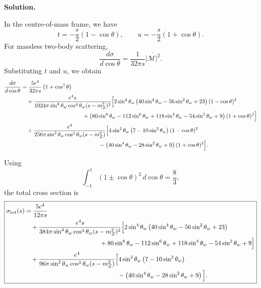 \documentclass[a4paper,11pt]{article}
\newenvironment{solution}{\par\medskip\noindent\textbf{Solution.}\par\smallskip}{\par\medskip}
\begin{document}
\begin{solution}
In the centre-of-mass frame, we have
\begin{equation}
    t=-\frac{s}{2}(1-\cos\theta),
    \qquad
    u=-\frac{s}{2}(1+\cos\theta).
\end{equation}
For massless two-body scattering,
\begin{equation}
    \frac{d\sigma}{d\cos\theta}
    =
    \frac{1}{32\pi s}\overline{|\mathcal M|^2}.
\end{equation}
Substituting $t$ and $u$, we obtain
\begin{equation}
\begin{aligned}
    \frac{d\sigma}{d\cos\theta}
    &=
    \frac{5e^4}{32\pi s}
    \left(1+\cos^2\theta\right)
    \\
    &\quad+
    \frac{e^4s}
    {1024\pi\sin^4\theta_w\cos^4\theta_w(s-m_Z^2)^2}
    \Big[
        2\sin^4\theta_w
        \left(
            40\sin^4\theta_w-56\sin^2\theta_w+23
        \right)
        (1-\cos\theta)^2
    \\
    &\hspace{3.8cm}
        +
        \left(
            80\sin^8\theta_w-112\sin^6\theta_w
            +118\sin^4\theta_w-54\sin^2\theta_w+9
        \right)
        (1+\cos\theta)^2
    \Big]
    \\
    &\quad+
    \frac{e^4}
    {256\pi\sin^2\theta_w\cos^2\theta_w(s-m_Z^2)}
    \Big[
        4\sin^2\theta_w
        \left(7-10\sin^2\theta_w\right)
        (1-\cos\theta)^2
    \\
    &\hspace{4.8cm}
        -
        \left(
            40\sin^4\theta_w-28\sin^2\theta_w+9
        \right)
        (1+\cos\theta)^2
    \Big].
\end{aligned}
\end{equation}

Using
\begin{equation}
    \int_{-1}^{1}(1\pm\cos\theta)^2\,d\cos\theta
    =\frac{8}{3},
\end{equation}
the total cross section is
\begin{equation}
\boxed{
\begin{aligned}
    \sigma_{\mathrm{tot}}(s)
    &=
    \frac{5e^4}{12\pi s}
    \\
    &\quad+
    \frac{e^4s}
    {384\pi\sin^4\theta_w\cos^4\theta_w(s-m_Z^2)^2}
    \Big[
        2\sin^4\theta_w
        \left(
            40\sin^4\theta_w-56\sin^2\theta_w+23
        \right)
    \\
    &\hspace{4.2cm}
        +
        80\sin^8\theta_w-112\sin^6\theta_w
        +118\sin^4\theta_w-54\sin^2\theta_w+9
    \Big]
    \\
    &\quad+
    \frac{e^4}
    {96\pi\sin^2\theta_w\cos^2\theta_w(s-m_Z^2)}
    \Big[
        4\sin^2\theta_w
        \left(7-10\sin^2\theta_w\right)
    \\
    &\hspace{5.2cm}
        -
        \left(
            40\sin^4\theta_w-28\sin^2\theta_w+9
        \right)
    \Big].
\end{aligned}
}
\end{equation}


\end{solution}
\end{document}
